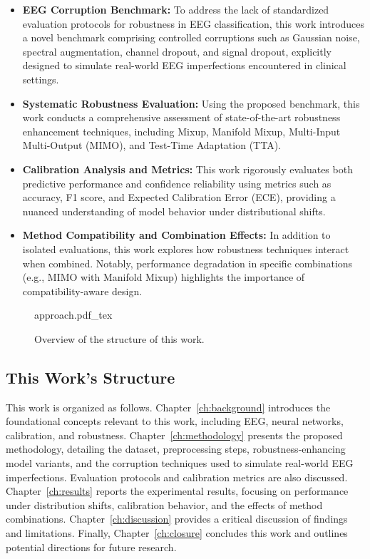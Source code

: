 \begin{itemize}
    \item \textbf{EEG Corruption Benchmark:} To address the lack of standardized evaluation protocols for robustness in EEG classification, this work introduces a novel benchmark comprising controlled corruptions such as Gaussian noise, spectral augmentation, channel dropout, and signal dropout, explicitly designed to simulate real-world EEG imperfections encountered in clinical settings.

    \item \textbf{Systematic Robustness Evaluation:} Using the proposed benchmark, this work conducts a comprehensive assessment of state-of-the-art robustness enhancement techniques, including Mixup, Manifold Mixup, Multi-Input Multi-Output (MIMO), and Test-Time Adaptation (TTA).

    \item \textbf{Calibration Analysis and Metrics:} This work rigorously evaluates both predictive performance and confidence reliability using metrics such as accuracy, F1 score, and Expected Calibration Error (ECE), providing a nuanced understanding of model behavior under distributional shifts.

    \item \textbf{Method Compatibility and Combination Effects:} In addition to isolated evaluations, this work explores how robustness techniques interact when combined. Notably, performance degradation in specific combinations (e.g., MIMO with Manifold Mixup) highlights the importance of compatibility-aware design.
\end{itemize}
\begin{figure}[h!]
	\centering
        \def\svgwidth{400pt}
        \fontsize{7pt}{7pt}
 	{approach.pdf_tex} 	  	 	
	\caption[Overview of the structure of this work]{Overview of the structure of this work.}
	\label{fig:approach}
\end{figure}

\subsection*{This Work’s Structure}
This work is organized as follows. Chapter~\ref{ch:background} introduces the foundational concepts relevant to this work, including EEG, neural networks, calibration, and robustness. Chapter~\ref{ch:methodology} presents the proposed methodology, detailing the dataset, preprocessing steps, robustness-enhancing model variants, and the corruption techniques used to simulate real-world EEG imperfections. Evaluation protocols and calibration metrics are also discussed. Chapter~\ref{ch:results} reports the experimental results, focusing on performance under distribution shifts, calibration behavior, and the effects of method combinations. Chapter~\ref{ch:discussion} provides a critical discussion of findings and limitations. Finally, Chapter~\ref{ch:closure} concludes this work and outlines potential directions for future research.

